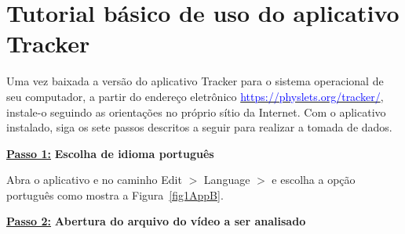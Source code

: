 
\chapter{Tutorial básico de uso do aplicativo Tracker}
\label{sec:tracker}
\vspace{-0.7cm}

Uma vez baixada a versão do aplicativo Tracker para o sistema operacional de seu computador, 
a partir do  endereço eletrônico  \href{https://physlets.org/tracker/}{\textcolor {blue}
{https://physlets.org/tracker/}}, instale-o seguindo as orientações no próprio sítio da Internet. Com o aplicativo instalado, siga os sete  passos descritos a seguir para realizar a tomada de dados.

\underline{\bf Passo 1:} {\bf Escolha de idioma português}\\
\vskip -0.5cm

Abra o aplicativo e no caminho Edit $>$ Language $>$ e escolha a opção português como mostra a Figura~\ref{fig1AppB}.

\underline{\bf Passo 2:} {\bf Abertura do arquivo do vídeo a ser analisado}\\
\vskip -0.5cm


